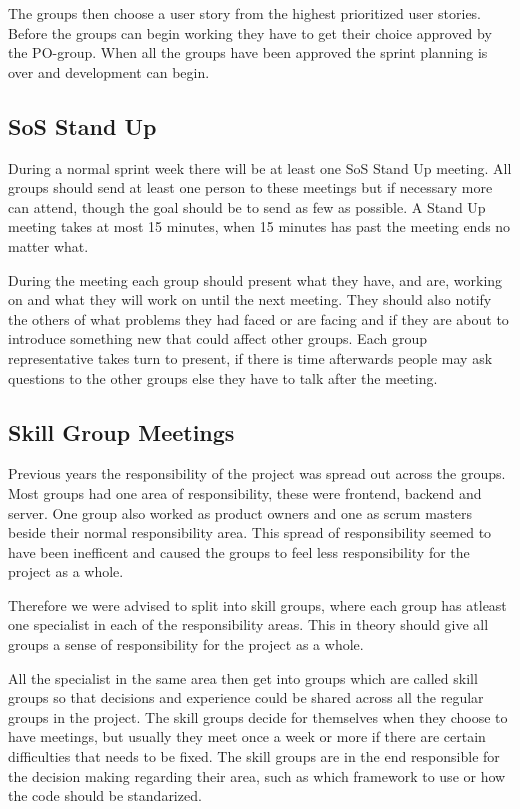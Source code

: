 The groups then choose a user story from the highest prioritized user stories.
Before the groups can begin working they have to get their choice approved by the PO-group.
When all the groups have been approved the sprint planning is over and development can begin.

\subsection{SoS Stand Up}
During a normal sprint week there will be at least one SoS Stand Up meeting.
All groups should send at least one person to these meetings but if necessary more can attend, though the goal should be to send as few as possible.
A Stand Up meeting takes at most 15 minutes, when 15 minutes has past the meeting ends no matter what.

During the meeting each group should present what they have, and are, working on and what they will work on until the next meeting.
They should also notify the others of what problems they had faced or are facing and if they are about to introduce something new that could affect other groups.
Each group representative takes turn to present, if there is time afterwards people may ask questions to the other groups else they have to talk after the meeting.


\subsection{Skill Group Meetings}
Previous years the responsibility of the project was spread out across the groups.
Most groups had one area of responsibility, these were frontend, backend and server.
One group also worked as product owners and one as scrum masters beside their normal responsibility area.
This spread of responsibility seemed to have been inefficent and caused the groups to feel less responsibility for the project as a whole.

Therefore we were advised to split into skill groups, where each group has atleast one specialist in each of the responsibility areas.
This in theory should give all groups a sense of responsibility for the project as a whole.

All the specialist in the same area then get into groups which are called skill groups so that decisions and experience could be shared across all the regular groups in the project.
The skill groups decide for themselves when they choose to have meetings, but usually they meet once a week or more if there are certain difficulties that needs to be fixed.
The skill groups are in the end responsible for the decision making regarding their area, such as which framework to use or how the code should be standarized.

